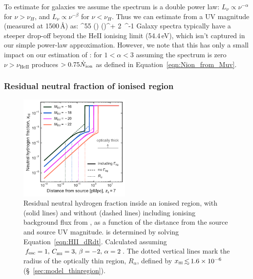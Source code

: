 \documentclass[fleqn,usenatbib]{mnras}
\begin{document}
To estimate \Nion for galaxies we assume the spectrum is a double power law: $L_\nu \propto \nu^{-\alpha}$ for $\nu > \nu_H$, and $L_\nu \propto \nu^{-\beta}$ for $\nu < \nu_H$. Thus we can estimate \Nion from a UV magnitude (measured at 1500\,\AA) as:
%
\BE \label{eqn:Nion_from_Muv}
\Nion {}^{55} \left(\right) \left(\right)^{\beta + 2} \,^{-1}
\EE
%
Galaxy spectra typically have a steeper drop-off beyond the HeII ionising limit (54.4\,eV), which isn't captured in our simple power-law approximation. However, we note that this has only a small impact on our estimation of \Nion: for $1 < \alpha < 3$ assuming the spectrum is zero $\nu >\nu_\mathrm{HeII}$ produces $>0.75\Nion$ as defined in Equation~\eqref{eqn:Nion_from_Muv}.

\subsubsection{Residual neutral fraction of ionised region}
\label{sec:model_HIIregion_xHI}

\begin{figure}
    \includegraphics[width=0.49\textwidth]{figs/fig2.pdf}
    \caption{Residual neutral hydrogen fraction inside an ionised region, with (solid lines) and without (dashed lines) including ionising background flux from \citet{Khaire2019}, as a function of the distance from the source and source UV magnitude. \Rion is determined by solving Equation~\eqref{eqn:HII_dRdt}. Calculated assuming $\fesc=1, \, \clump=3, \, \beta=-2, \, \alpha = 2$. The dotted vertical lines mark the radius of the optically thin region, $R_\alpha$, defined by $\xHI \simlt 1.6\times10^{-6}$ (\S~\ref{sec:model_thinregion}).}
    \label{fig:x_HII_r}
\end{figure}
\end{document}

